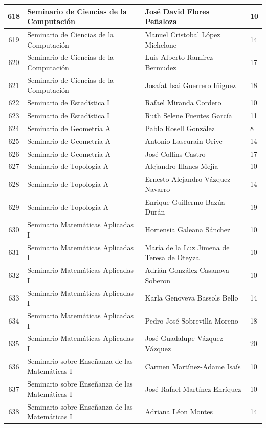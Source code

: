 {\begin{longtable}{|c|p{6.5cm}|p{5cm}|p{1.5cm}|}
  618 & Seminario de Ciencias de la Computación & José David Flores Peñaloza & 10 \\ \hline
  619 & Seminario de Ciencias de la Computación & Manuel Cristobal López Michelone & 14 \\ \hline
  620 & Seminario de Ciencias de la Computación & Luis Alberto Ramírez Bermudez & 17 \\ \hline
  621 & Seminario de Ciencias de la Computación & Josafat Isai Guerrero Iñiguez & 18 \\ \hline
  622 & Seminario de Estadística I & Rafael Miranda Cordero & 10 \\ \hline
  623 & Seminario de Estadística I & Ruth Selene Fuentes García & 11 \\ \hline
  624 & Seminario de Geometría A & Pablo Rosell González & 8 \\ \hline
  625 & Seminario de Geometría A & Antonio Lascurain Orive & 14 \\ \hline
  626 & Seminario de Geometría A & José Collins Castro & 17 \\ \hline
  627 & Seminario de Topología A & Alejandro Illanes Mejía & 10 \\ \hline
  628 & Seminario de Topología A & Ernesto Alejandro Vázquez Navarro & 14 \\ \hline
  629 & Seminario de Topología A & Enrique Guillermo Bazúa Durán & 19 \\ \hline
  630 & Seminario Matemáticas Aplicadas I & Hortensia Galeana Sánchez & 10 \\ \hline
  631 & Seminario Matemáticas Aplicadas I & María de la Luz Jimena de Teresa de Oteyza & 10 \\ \hline
  632 & Seminario Matemáticas Aplicadas I & Adrián González Casanova Soberon & 10 \\ \hline
  633 & Seminario Matemáticas Aplicadas I & Karla Genoveva Bassols Bello & 14 \\ \hline
  634 & Seminario Matemáticas Aplicadas I & Pedro José Sobrevilla Moreno & 18 \\ \hline
  635 & Seminario Matemáticas Aplicadas I & José Guadalupe Vázquez Vázquez & 20 \\ \hline
  636 & Seminario sobre Enseñanza de las Matemáticas I & Carmen Martínez-Adame Isaís & 10 \\ \hline
  637 & Seminario sobre Enseñanza de las Matemáticas I & José Rafael Martínez Enríquez & 10 \\ \hline
  638 & Seminario sobre Enseñanza de las Matemáticas I & Adriana Léon Montes & 14 \\ \hline

\end{longtable}}

